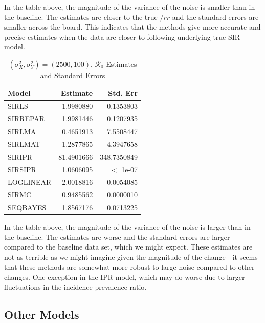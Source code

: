 \message{ !name(draft_v13.tex)}\documentclass[12pt]{article}
\newcommand{\rr}{\ensuremath{\mathcal{R}_0}}
\begin{document}
In the table above, the magnitude of the variance of the noise is smaller than in the baseline. The estimates are closer to the true $/rr$ and the standard errors are smaller across the board. This indicates that the methods give more accurate and precise estimates when the data are closer to following underlying true SIR model.


\begin{table}[H]
	
	\caption{\label{tab:} $(\sigma^2_X, \sigma^2_Y) = (2500, 100)$, $\rr$ Estimates and Standard Errors}
	\centering
	\begin{tabular}[t]{l|r|r}
		\hline
		Model & Estimate & Std. Err\\
		\hline
		SIRLS & 1.9980880 & 0.1353803\\
		\hline
		SIRREPAR & 1.9981446 & 0.1207935\\
		\hline
		SIRLMA & 0.4651913 & 7.5508447\\
		\hline
		SIRLMAT & 1.2877865 & 4.3947658\\
		\hline
		SIRIPR & 81.4901666 & 348.7350849\\
		\hline
		SIRSIPR & 1.0606095 & $<$ 1e-07\\
		\hline
		LOGLINEAR & 2.0018816 & 0.0054085\\
		\hline
		SIRMC & 0.9485562 & 0.0000010\\
		\hline
		SEQBAYES & 1.8567176 & 0.0713225\\
		\hline
	\end{tabular}
\end{table}

In the table above, the magnitude of the variance of the noise is larger than in the baseline. The estimates are worse and the standard errors are larger compared to the baseline data set, which we might expect. These estimates are not as terrible as we might imagine given the magnitude of the change - it seems that these methods are somewhat more robust to large noise compared to other changes. One exception in the IPR model, which may do worse due to larger fluctuations in the incidence prevalence ratio. 

\subsection{Other Models}\label{sec:res-oth}
\end{document}
